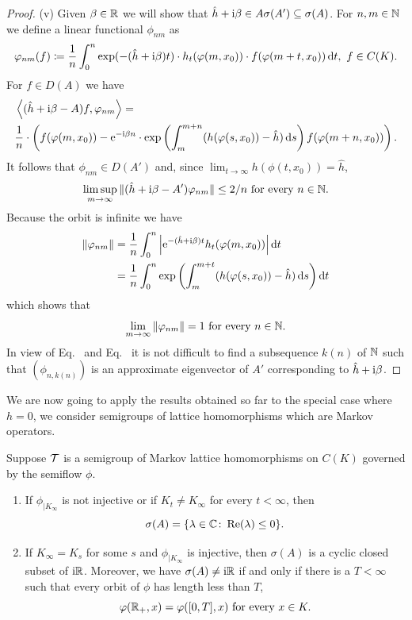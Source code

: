 \begin{proof}
    (v) Given $\beta \in \mathbb{R}$ we will show that $\hat{h} + \mathrm{i}\beta \in A\sigma(A') \subseteq \sigma(A)$.
    For $n,m \in \mathbb{N}$ we define a linear functional $\phi_{nm}$ as 
\[  
	\phi_{nm}(f) \coloneq \frac{1}{n}\int_{0}^{n} \exp(-(\hat{h}+\im\beta )t)\cdot h_{t}(\phi(m,x_{0}))\cdot f(\phi(m+t,x_{0})) \dt, \ f\in C(K).
\]
For $f \in D(A)$ we have 
	\begin{align*}
	&\left\langle(\hat{h}+\im\beta -A)f,\phi_{nm}\right\rangle = \\
	&  \frac{1}{n}\cdot\left(f(\phi(m,x_{0})) - \eu^{-\im\beta  n}\cdot %
	\exp\left(\int_{m}^{m+n} (h(\phi(s,x_{0}))-\hat{h})\ds \right)f(\phi(m+n,x_{0}))\right).
	\end{align*}
It follows that $\phi_{nm} \in D(A')$ and, since $\lim_{t\to\infty} h(\phi(t,x_{0})) = \hat{h}$,
\begin{equation}\label{eq:b3-4.13}
	\limsup_{m\to\infty} \|(\hat{h}+\im\beta -A')\phi_{nm}\| \leq 2/n \text{ for every } n \in \N.
\end{equation}
Because the orbit is infinite we have
	\begin{align*}
	\|\phi_{nm}\| &= \frac{1}{n}\int_{0}^{n} \left|\eu^{-(\hat{h}+\im\beta )t} h_{t}(\phi(m,x_{0}))\right| \dt \\
	&= \frac{1}{n}\int_{0}^{n} \exp\left(\int_{m}^{m+t} (h(\phi(s,x_{0}))-\hat{h})\ds \right)\dt
	\end{align*}
which shows that
\begin{equation}\label{eq:b3-4.14}
	\lim_{m\to\infty} \|\phi_{nm}\| = 1 \text{ for every } n \in \N.
\end{equation}
In view of Eq.~ and Eq.~ it is not difficult to find a subsequence $k(n)$ of\/ $\mathbb{N}$ such that $(\phi_{n,k(n)})$ is an approximate eigenvector of\/ $A'$ corresponding to $\hat{h} + \mathrm{i}\beta$.
\end{proof}
We are now going to apply the results obtained so far to the special case where $h = 0$, \ie we consider semigroups of lattice homomorphisms which are Markov operators.
\begin{theorem}\label{thm:b3-4.9}
	Suppose $\mathcal{T}$ is a semigroup of Markov lattice homomorphisms on $C(K)$ governed by the semiflow $\phi$.
	\begin{enumerate}[\upshape (i)]
		\item 
		If\/ $\phi_{|K_{\infty}}$ is not injective or if\/ $K_{t} \neq K_{\infty}$ for every $t < \infty$, then \[
        \sigma(A) = \{\lambda \in \C \colon \Re(\lambda) \leq 0\} .
		\]
		\item 
		If\/ $K_{\infty} = K_{s}$ for some $s$ and $\phi_{|K_{\infty}}$ is injective, then $\sigma(A)$ is a cyclic closed subset of\/ $\mathrm{i} \mathbb{R}$.
		Moreover, we have $\sigma(A) \neq \mathrm{i}\mathbb{R}$ if and only if there is a $T < \infty$ such that every orbit of\/ $\phi$ has length less than $T$, \ie 
        \[
        \phi(\R_{+},x) = \phi([0,T],x) \text{ for every } x \in K .
        \]
	\end{enumerate}
\end{theorem}
